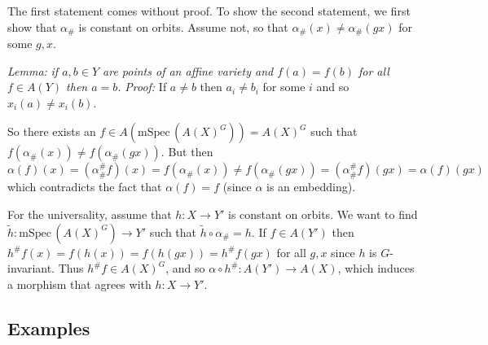 \documentclass[10pt]{article}
\begin{document}
\begin{itemize}
                    The first statement comes without proof.
                    To show the second statement, we first show that $\alpha_\#$ is constant on orbits.
                    Assume not, so that $\alpha_\#(x)\neq\alpha_\#(gx)$ for some $g,x$.

                    \emph{Lemma:} \emph{if $a,b\in Y$ are points of an affine variety and $f(a)=f(b)$ for all $f\in A(Y)$ then $a=b$.}
                    \emph{Proof:} If $a\neq b$ then $a_i\neq b_i$ for some $i$ and so $x_i(a)\neq x_i(b)$.

                    So there exists an $f\in A(\mathrm{mSpec}\,(A(X)^G))=A(X)^G$ such that $f(\alpha_\#(x))\neq f(\alpha_\#(gx))$.
                    But then
                    \begin{equation*}
                        \alpha(f)(x) = (\alpha_\#^\# f)(x) = f(\alpha_\#(x)) \neq f(\alpha_\#(gx)) = (\alpha_\#^\# f)(gx) = \alpha(f)(gx)
                    \end{equation*}
                    which contradicts the fact that $\alpha(f)=f$ (since $\alpha$ is an embedding).

                    For the universality, assume that $h\colon X\to Y'$ is constant on orbits.
                    We want to find $\tilde{h}\colon\mathrm{mSpec}\,(A(X)^G)\to Y'$ such that $\tilde{h}\circ\alpha_\#=h$.
                    If $f\in A(Y')$ then $h^\#f(x)=f(h(x))=f(h(gx))=h^\#f(gx)$ for all $g,x$ since $h$ is $G$-invariant.
                    Thus $h^\#f\in A(X)^G$, and so $\alpha\circ h^\#\colon A(Y')\to A(X)$, which induces a morphism that agrees with $h\colon X\to Y'$.
            \end{itemize}

        \subsection{Examples}
\end{document}
